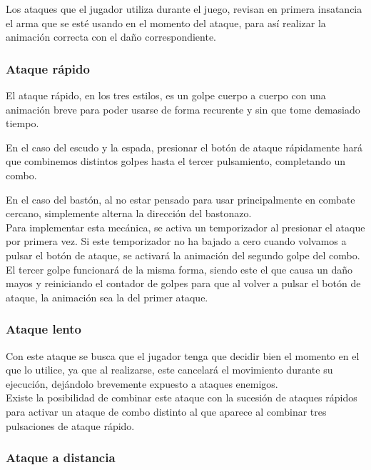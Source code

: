 \documentclass[12pt,spanish]{article}
\begin{document}
    Los ataques que el jugador utiliza durante el juego, revisan en primera insatancia el arma que se esté usando en el momento del ataque, para así realizar la animación correcta con el daño correspondiente.

\subsubsection{Ataque rápido}

    El ataque rápido, en los tres estilos, es un golpe cuerpo a cuerpo con una animación breve para poder usarse de forma recurente y sin que tome demasiado tiempo.

    En el caso del escudo y la espada, presionar el botón de ataque rápidamente hará que combinemos distintos golpes hasta el tercer pulsamiento, completando un combo.

    En el caso del bastón, al no estar pensado para usar principalmente en combate cercano, simplemente alterna la dirección del bastonazo.\\

    Para implementar esta mecánica, se activa un temporizador al presionar el ataque por primera vez. Si este temporizador no ha bajado a cero cuando volvamos a pulsar el botón de ataque, se activará la animación del segundo golpe del combo. El tercer golpe funcionará de la misma forma, siendo este el que causa un daño mayos y reiniciando el contador de golpes para que al volver a pulsar el botón de ataque, la animación sea la del primer ataque.

\subsubsection{Ataque lento}

    Con este ataque se busca que el jugador tenga que decidir bien el momento en el que lo utilice, ya que al realizarse, este cancelará el movimiento durante su ejecución, dejándolo brevemente expuesto a ataques enemigos.\\

    Existe la posibilidad de combinar este ataque con la sucesión de ataques rápidos para activar un ataque de combo distinto al que aparece al combinar tres pulsaciones de ataque rápido.

\newpage

\subsubsection{Ataque a distancia}
\end{document}
